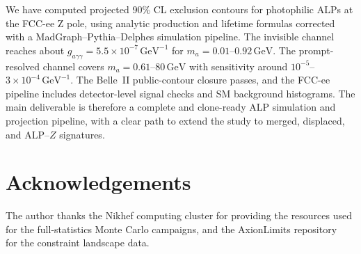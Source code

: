 \documentclass[12pt,a4paper]{article}
\begin{document}
We have computed projected 90\% CL exclusion contours for photophilic ALPs at
the FCC-ee Z pole, using analytic production and lifetime formulas corrected
with a MadGraph--Pythia--Delphes simulation pipeline. The invisible channel
reaches about $g_{a\gamma\gamma}=5.5\times10^{-7}\,\text{GeV}^{-1}$ for
$m_{a}=0.01$--$0.92\,\text{GeV}$. The prompt-resolved channel covers
$m_{a}=0.61$--$80\,\text{GeV}$ with sensitivity around
$10^{-5}$--$3\times10^{-4}\,\text{GeV}^{-1}$. The Belle~II public-contour
closure passes, and the FCC-ee pipeline includes detector-level signal checks
and SM background histograms. The main deliverable is therefore a complete and
clone-ready ALP simulation and projection pipeline, with a clear path to extend
the study to merged, displaced, and ALP--$Z$ signatures.

\section*{Acknowledgements}

The author thanks the Nikhef computing cluster for providing the resources
used for the full-statistics Monte Carlo campaigns, and the AxionLimits
repository~\cite{AxionLimits} for the constraint landscape data.
\end{document}
